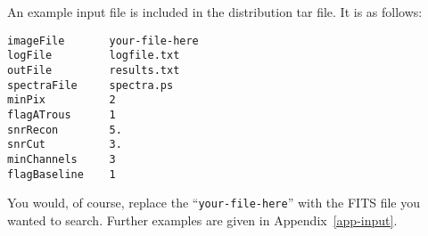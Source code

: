 An example input file is included in the distribution tar file. It is
as follows:

\begin{verbatim}
imageFile       your-file-here
logFile         logfile.txt
outFile         results.txt
spectraFile     spectra.ps
minPix          2
flagATrous      1
snrRecon        5.
snrCut          3.
minChannels     3
flagBaseline    1
\end{verbatim}

You would, of course, replace the ``\texttt{your-file-here}'' with the
FITS file you wanted to search. Further examples are given in
Appendix~\ref{app-input}.
